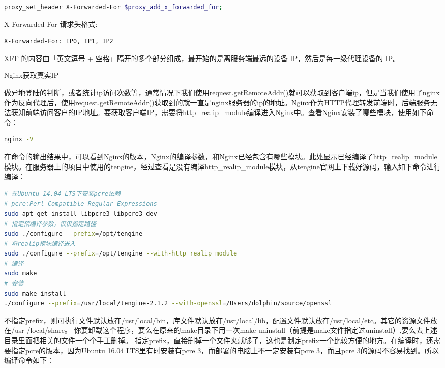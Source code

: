 \documentclass[11pt,fleqn]{book}
\makeatletter
\numberwithin{dummy}{section}
\theoremstyle{ocrenumbox}
\theoremstyle{blacknumex}
\theoremstyle{blacknumbox}
\theoremstyle{ocrenum}
\renewcommand{\subsection}{\@startsection {subsection}{2}{\z@}
	{-3ex \@plus -0.1ex \@minus -.4ex}
	{0.5ex \@plus.2ex }
	{\normalfont\sffamily\bfseries}}
\makeatother
\begin{document}
\begin{lstlisting}[language=bash]
proxy_set_header X-Forwarded-For $proxy_add_x_forwarded_for;
\end{lstlisting}

X-Forwarded-For 请求头格式:

\begin{lstlisting}[language=bash]
X-Forwarded-For: IP0, IP1, IP2
\end{lstlisting}

XFF 的内容由「英文逗号 + 空格」隔开的多个部分组成，最开始的是离服务端最远的设备 IP，然后是每一级代理设备的 IP。

\subsection{Nginx获取真实IP}

做异地登陆的判断，或者统计ip访问次数等，通常情况下我们使用request.getRemoteAddr()就可以获取到客户端ip，但是当我们使用了nginx作为反向代理后，使用request.getRemoteAddr()获取到的就一直是nginx服务器的ip的地址。Nginx作为HTTP代理转发前端时，后端服务无法获知前端访问客户的IP地址。要获取客户端IP，需要将http\_realip\_module编译进入Nginx中。查看Nginx安装了哪些模块，使用如下命令：

\begin{lstlisting}[language=bash]
nginx -V
\end{lstlisting}

在命令的输出结果中，可以看到Nginx的版本，Nginx的编译参数，和Nginx已经包含有哪些模块。此处显示已经编译了http\_realip\_module模块。在服务器上的项目中使用的tengine，经过查看是没有编译http\_realip\_module模块，从tengine官网上下载好源码，输入如下命令进行编译：

\begin{lstlisting}[language=bash]
# 在Ubuntu 14.04 LTS下安装pcre依赖
# pcre:Perl Compatible Regular Expressions
sudo apt-get install libpcre3 libpcre3-dev
# 指定预编译参数，仅仅指定路径
sudo ./configure --prefix=/opt/tengine
# 将realip模块编译进入
sudo ./configure --prefix=/opt/tengine --with-http_realip_module
# 编译
sudo make
# 安装
sudo make install
./configure --prefix=/usr/local/tengine-2.1.2 --with-openssl=/Users/dolphin/source/openssl
\end{lstlisting}

不指定prefix，则可执行文件默认放在/usr/local/bin，库文件默认放在/usr/local/lib，配置文件默认放在/usr/local/etc。其它的资源文件放在/usr /local/share。
你要卸载这个程序，要么在原来的make目录下用一次make uninstall（前提是make文件指定过uninstall）,要么去上述目录里面把相关的文件一个个手工删掉。
指定prefix，直接删掉一个文件夹就够了，这也是制定prefix一个比较方便的地方。在编译时，还需要指定pcre的版本，因为Ubuntu 16.04 LTS里有时安装有pcre 3，而部署的电脑上不一定安装有pcre 3，而且pcre 3的源码不容易找到。所以编译命令如下：
\end{document}
